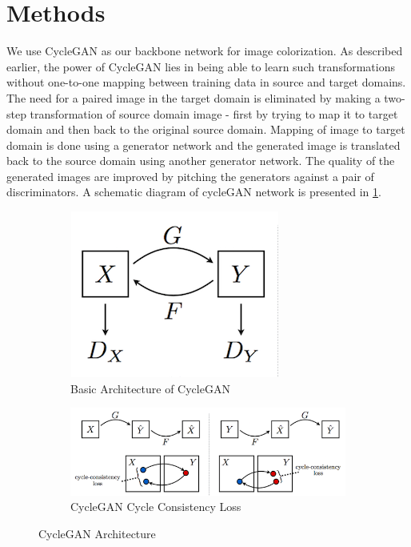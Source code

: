 \documentclass{article} %
\begin{document}
\section{Methods}
We use CycleGAN as our backbone network for image colorization. As described earlier, the power of CycleGAN lies in being able to learn such transformations without one-to-one mapping between training data in source and target domains. The need for a paired image in the target domain is eliminated by making a two-step transformation of source domain image - first by trying to map it to target domain and then back to the original source domain. Mapping of image to target domain is done using a generator network and the generated image is translated back to the source domain using another generator network. The quality of the generated images are improved by pitching the generators against a pair of discriminators. A schematic diagram of cycleGAN network is presented in \ref{fig:base}.
\begin{figure}[!htb]
\centering
\begin{subfigure}{.3\textwidth}
  \centering
  \includegraphics[width=1\linewidth]{cyclegan.png}
  \caption{Basic Architecture of CycleGAN}
  \label{fig:base}
\end{subfigure}%
\begin{subfigure}{.6\textwidth}
  \centering
  \includegraphics[width=1\linewidth]{cycle_consistency.png}
  \caption{CycleGAN Cycle Consistency Loss}
  \label{fig:consistency}
\end{subfigure}
\caption{CycleGAN Architecture}
\label{fig:cyclegan}
\end{figure}
\end{document}
